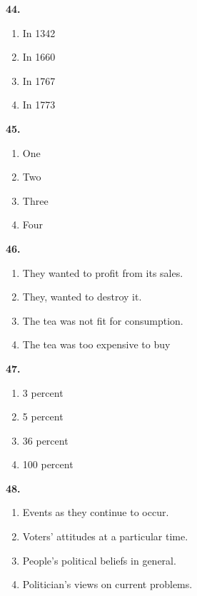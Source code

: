 \documentclass[12pt]{article}
\begin{document}
\par
\vspace{0.25\baselineskip}
\noindent\textbf{44.}
\begin{enumerate}[label=(\Alph*),leftmargin=*,itemsep=0.2em]
\item In 1342
\item In 1660
\item In 1767
\item In 1773
\end{enumerate}
\par
\vspace{0.25\baselineskip}
\noindent\textbf{45.}
\begin{enumerate}[label=(\Alph*),leftmargin=*,itemsep=0.2em]
\item One
\item Two
\item Three
\item Four
\end{enumerate}
\par
\vspace{0.25\baselineskip}
\noindent\textbf{46.}
\begin{enumerate}[label=(\Alph*),leftmargin=*,itemsep=0.2em]
\item They wanted to profit from its sales.
\item They, wanted to destroy it.
\item The tea was not fit for consumption.
\item The tea was too expensive to buy
\end{enumerate}
\par
\vspace{0.25\baselineskip}
\noindent\textbf{47.}
\begin{enumerate}[label=(\Alph*),leftmargin=*,itemsep=0.2em]
\item 3 percent
\item 5 percent
\item 36 percent
\item 100 percent
\end{enumerate}
\par
\vspace{0.25\baselineskip}
\noindent\textbf{48.}
\begin{enumerate}[label=(\Alph*),leftmargin=*,itemsep=0.2em]
\item Events as they continue to occur.
\item Voters' attitudes at a particular time.
\item People's political beliefs in general.
\item Politician's views on current problems.
\end{enumerate}
\end{document}
